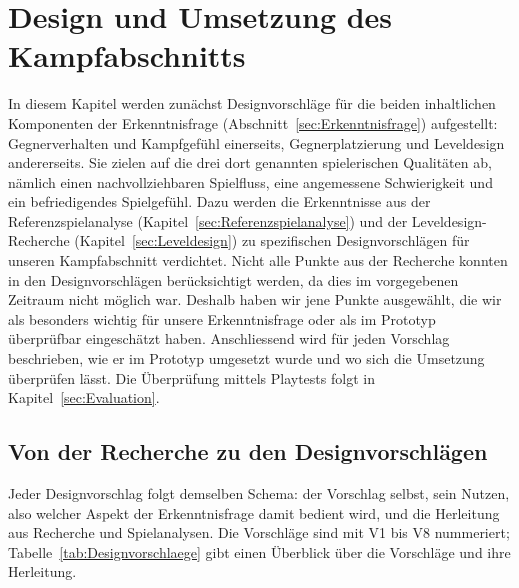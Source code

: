 \documentclass[../Main.tex]{subfiles}
\begin{document}
\section{Design und Umsetzung des Kampfabschnitts} \label{sec:Umsetzung}

In diesem Kapitel werden zunächst Designvorschläge für die beiden inhaltlichen Komponenten der Erkenntnisfrage (Abschnitt~\ref{sec:Erkenntnisfrage}) aufgestellt: Gegnerverhalten und Kampfgefühl einerseits, Gegnerplatzierung und Leveldesign andererseits. Sie zielen auf die drei dort genannten spielerischen Qualitäten ab, nämlich einen nachvollziehbaren Spielfluss, eine angemessene Schwierigkeit und ein befriedigendes Spielgefühl. Dazu werden die Erkenntnisse aus der Referenzspielanalyse (Kapitel~\ref{sec:Referenzspielanalyse}) und der Leveldesign-Recherche (Kapitel~\ref{sec:Leveldesign}) zu spezifischen Designvorschlägen für unseren Kampfabschnitt verdichtet. Nicht alle Punkte aus der Recherche konnten in den Designvorschlägen berücksichtigt werden, da dies im vorgegebenen Zeitraum nicht möglich war. Deshalb haben wir jene Punkte ausgewählt, die wir als besonders wichtig für unsere Erkenntnisfrage oder als im Prototyp überprüfbar eingeschätzt haben. Anschliessend wird für jeden Vorschlag beschrieben, wie er im Prototyp umgesetzt wurde und wo sich die Umsetzung überprüfen lässt. Die Überprüfung mittels Playtests folgt in Kapitel~\ref{sec:Evaluation}.

\subsection{Von der Recherche zu den Designvorschlägen} \label{sec:Designvorschlaege}

Jeder Designvorschlag folgt demselben Schema: der Vorschlag selbst, sein Nutzen, also welcher Aspekt der Erkenntnisfrage damit bedient wird, und die Herleitung aus Recherche und Spielanalysen. Die Vorschläge sind mit V1 bis V8 nummeriert; Tabelle~\ref{tab:Designvorschlaege} gibt einen Überblick über die Vorschläge und ihre Herleitung.
\end{document}
